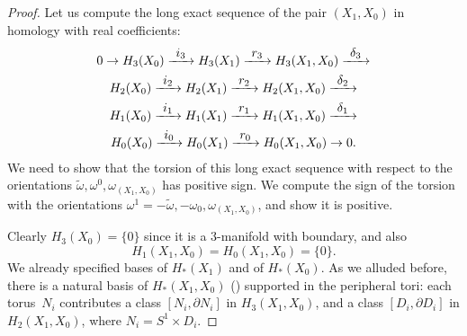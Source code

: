 \documentclass[10pt]{amsart}
\newcommand\To[1]{\mathchoice{\xrightarrow{\textstyle\kern4pt#1\kern3pt}}{\stackrel{#1}{\longrightarrow}}{}{}}
\theoremstyle{plain}
\theoremstyle{definition}
\theoremstyle{remark}
\numberwithin{equation}{section}
\begin{document}
\begin{proof}
Let us compute the long exact sequence of the pair $(X_1,X_0)$ in homology with real coefficients:
\begin{multline}
\label{eq:LES}
0 \to H_3(X_0) \To{i_3} H_3(X_1) \To{r_3} H_3(X_1, X_0) \To{\delta_3} \\
H_2(X_0) \To{i_2} H_2(X_1) \To{r_2} H_2(X_1, X_0) \To{\delta_2}\\
H_1(X_0) \To{i_1} H_1(X_1) \To{r_1} H_1(X_1, X_0) \To{\delta_1}\\
H_0(X_0) \To{i_0} H_0(X_1) \To{r_0} H_0(X_1, X_0) \to 0.
\end{multline}
We need to show that the torsion of this long exact sequence with respect to the orientations $\widetilde \omega, \omega^0, \omega_{(X_1,X_0)}$ has positive sign. We compute the sign of the torsion with the orientations $\omega^1 = -\widetilde \omega, -\omega_0, \omega_{(X_1,X_0)}$, and show it is positive.

Clearly $H_3(X_0) = \{0 \}$ since it is a 3\nobreakdash-manifold with boundary, and also
\[
H_1(X_1, X_0) = H_0(X_1, X_0) = \{0\}.
\]
We already specified bases of $H_*(X_1)$ and of $H_*(X_0)$. As we alluded before, there is a natural basis of $H_*(X_1, X_0)$ (\cite[V.2.2]{Turaev_tors}) supported in the peripheral tori: each torus~$N_i$ contributes a class $[N_i, \partial N_i]$ in $H_3(X_1, X_0)$, and a class $[D_i, \partial D_i]$ in $H_2(X_1, X_0)$, where $N_i = S^1 \times D_i$.


\end{proof}
\end{document}
